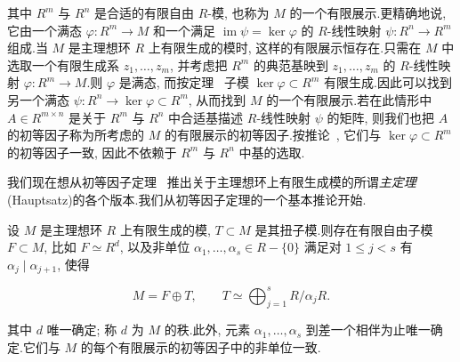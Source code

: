 其中 $R^m$ 与 $R^n$ 是合适的有限自由 $R$-模, 也称为 $M$ 的一个有限展示.更精确地说, 它由一个满态 $\varphi \colon R^m \longrightarrow M$ 和一个满足 $\operatorname{im} \psi = \ker \varphi$ 的 $R$-线性映射 $\psi \colon R^n \longrightarrow R^m$ 组成.当 $M$ 是主理想环 $R$ 上有限生成的模时, 这样的有限展示恒存在.只需在 $M$ 中选取一个有限生成系 $z_1, \ldots, z_m$, 并考虑把 $R^m$ 的典范基映到 $z_1, \ldots, z_m$ 的 $R$-线性映射 $\varphi \colon R^m \longrightarrow M$.则 $\varphi$ 是满态, 而按定理~ 子模 $\ker \varphi \subset R^m$ 有限生成.因此可以找到另一个满态 $\psi \colon R^n \longrightarrow \ker \varphi \subset R^m$, 从而找到 $M$ 的一个有限展示.若在此情形中 $A \in R^{m \times n}$ 是关于 $R^m$ 与 $R^n$ 中合适基描述 $R$-线性映射 $\psi$ 的矩阵, 则我们也把 $A$ 的初等因子称为所考虑的 $M$ 的有限展示的初等因子.按推论~, 它们与 $\ker \varphi \subset R^m$ 的初等因子一致, 因此不依赖于 $R^m$ 与 $R^n$ 中基的选取.

我们现在想从初等因子定理~ 推出关于主理想环上有限生成模的所谓\emph{主定理}(\textup{Hauptsatz})的各个版本.我们从初等因子定理的一个基本推论开始.

\begin{theorem}\label{thm:6.4.2}
设 $M$ 是主理想环 $R$ 上有限生成的模, $T \subset M$ 是其扭子模.则存在有限自由子模 $F \subset M$, 比如 $F \simeq R^d$, 以及非单位 $\alpha_1, \ldots, \alpha_s \in R - \{0\}$ 满足对 $1 \leq j < s$ 有 $\alpha_j \mid \alpha_{j + 1}$, 使得

\[
M = F \oplus T, \qquad T \simeq \bigoplus_{j = 1}^{s} R/\alpha_j R\text{.}\]

其中 $d$ 唯一确定; 称 $d$ 为 $M$ 的秩.此外, 元素 $\alpha_1, \ldots, \alpha_s$ 到差一个相伴为止唯一确定.它们与 $M$ 的每个有限展示的初等因子中的非单位一致.
\end{theorem}

